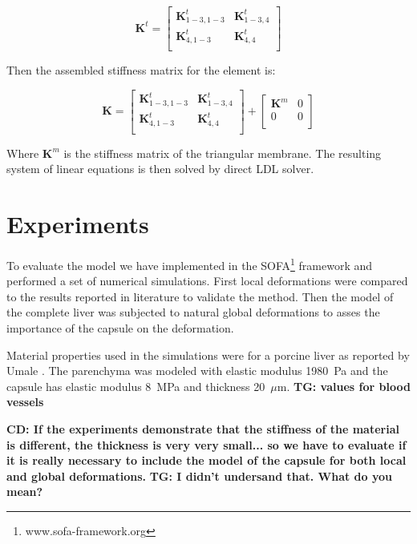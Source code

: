 \documentclass{llncs}
\newcommand{\TG}[1]{{\color{blue}\textbf{TG: #1}}}
\newcommand{\CD}[1]{{\color{green}\textbf{CD: #1}}}
\newcommand{\Mat}[1]{\mathbf{#1}}
\begin{document}
\begin{equation}
  \Mat{K}^t = \left[\begin{array}{c|c}
      \Mat{K}^t_{1-3,1-3} & \Mat{K}^t_{1-3,4} \\
      \hline
      \Mat{K}^t_{4,1-3} & \Mat{K}^t_{4,4} \\
  \end{array}\right]
\end{equation}

Then the assembled stiffness matrix for the element is:

\begin{equation}
  \Mat{K} = \left[\begin{array}{c|c}
      \Mat{K}^t_{1-3,1-3} & \Mat{K}^t_{1-3,4} \\
      \hline
      \Mat{K}^t_{4,1-3} & \Mat{K}^t_{4,4} \\
  \end{array}\right]
  +
  \left[\begin{array}{c|c}
      \Mat{K}^m & 0 \\
      \hline
      0 & 0 \\
  \end{array}\right]
\end{equation}

Where $\Mat{K}^m$ is the stiffness matrix of the triangular membrane.
The resulting
system of linear equations is then solved by direct LDL solver.




\section{Experiments} %

To evaluate the model we have implemented in the
SOFA\footnote{www.sofa-framework.org} framework and performed a set of
numerical simulations. First local deformations were compared to the
results reported in literature to validate the method. Then the model of
the complete liver was subjected to natural global deformations to asses
the importance of the capsule on the deformation.

Material properties used in the simulations were for a porcine liver as
reported by Umale \cite{Umale2013}. The
parenchyma was modeled with elastic modulus 1980~Pa and the capsule has
elastic modulus 8~MPa and thickness 20~$\mu$m.
\TG{values for blood vessels}


\CD{If the experiments demonstrate that the stiffness of the material is different, the thickness is very very small... so we have to evaluate if it is really necessary to include the model of the capsule for both local and global deformations.}
\TG{I didn't undersand that. What do you mean?}
\end{document}
